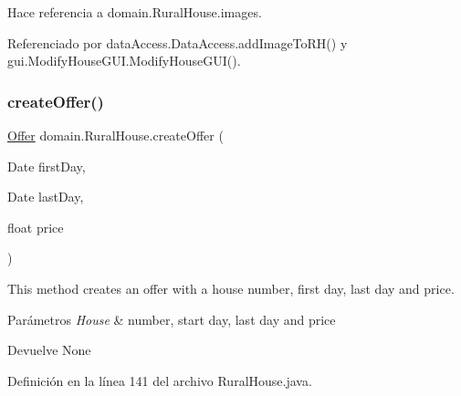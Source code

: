 Hace referencia a domain.\+Rural\+House.\+images.



Referenciado por data\+Access.\+Data\+Access.\+add\+Image\+To\+R\+H() y gui.\+Modify\+House\+G\+U\+I.\+Modify\+House\+G\+U\+I().

\mbox{\label{classdomain_1_1_rural_house_a58e17e08a7b28a75bc1b8e3d6ac01764}} 
\subsubsection{\texorpdfstring{createOffer()}{createOffer()}}
{\footnotesize\ttfamily \mbox{\hyperlink{classdomain_1_1_offer}{Offer}} domain.\+Rural\+House.\+create\+Offer (\begin{DoxyParamCaption}\item[{Date}]{first\+Day,  }\item[{Date}]{last\+Day,  }\item[{float}]{price }\end{DoxyParamCaption})}



This method creates an offer with a house number, first day, last day and price. 


\begin{DoxyParams}{Parámetros}
{\em House} & number, start day, last day and price \\
\hline
\end{DoxyParams}
\begin{DoxyReturn}{Devuelve}
None 
\end{DoxyReturn}


Definición en la línea 141 del archivo Rural\+House.\+java.


\begin{DoxyCode}{0}

\end{DoxyCode}


